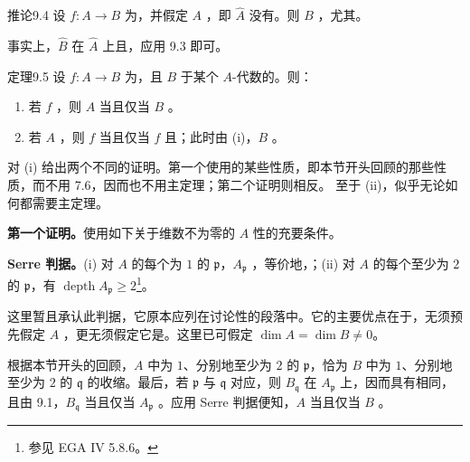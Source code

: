 \begin{SGAresult}{推论}{9.4}
设 $f\colon A\to B$ 为，并假定 $A$ ，即 $\widehat A$ 没有。则 $B$ ，尤其。
\end{SGAresult}
事实上，$\widehat B$ 在 $\widehat A$ 上且，应用 9.3 即可。
\begin{SGAresult}{定理}{9.5}
设 $f\colon A\to B$ 为，且 $B$ 于某个 $A$-代数的。则：
\begin{enumerate}
\item[(i)] 若 $f$ ，则 $A$ 当且仅当 $B$ 。
\item[(ii)] 若 $A$ ，则 $f$ 当且仅当 $f$ 且；此时由 (i)，$B$ 。
\end{enumerate}
\end{SGAresult}
对 (i) 给出两个不同的证明。第一个使用的某些性质，即本节开头回顾的那些性质，而不用 7.6，因而也不用主定理；第二个证明则相反。
至于 (ii)，似乎无论如何都需要主定理。

\textbf{第一个证明。}使用如下关于维数不为零的 $A$ 性的充要条件。

\textbf{Serre 判据。}(i) 对 $A$ 的每个为 $1$ 的 $\mathfrak p$，$A_{\mathfrak p}$ ，等价地，；(ii) 对 $A$ 的每个至少为 $2$ 的 $\mathfrak p$，有 $\operatorname{depth}A_{\mathfrak p}\geq2$\footnote{参见 EGA IV 5.8.6。}。

这里暂且承认此判据，它原本应列在讨论性的段落中。它的主要优点在于，无须预先假定 $A$ ，更无须假定它是。这里已可假定 $\dim A=\dim B\neq0$。

根据本节开头的回顾，$A$ 中为 $1$、分别地至少为 $2$ 的 $\mathfrak p$，恰为 $B$ 中为 $1$、分别地至少为 $2$ 的 $\mathfrak q$ 的收缩。最后，若 $\mathfrak p$ 与 $\mathfrak q$ 对应，则 $B_{\mathfrak q}$ 在 $A_{\mathfrak p}$ 上，因而具有相同，且由 9.1，$B_{\mathfrak q}$ 当且仅当 $A_{\mathfrak p}$ 。应用 Serre 判据便知，$A$ 当且仅当 $B$ 。

